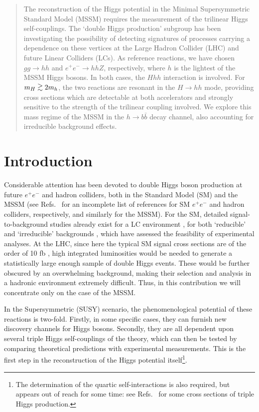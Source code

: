 \vskip1.0cm
\begin{abstract}
  The reconstruction of the Higgs potential in the Minimal
  Supersymmetric Standard Model (MSSM) requires the measurement of the
  trilinear Higgs self-couplings.  The `double Higgs production'
  subgroup has been investigating the possibility of detecting
  signatures of processes carrying a dependence on these vertices at
  the Large Hadron Collider (LHC) and future Linear Colliders (LCs).
  As reference reactions, we have chosen $gg\to hh$ and $e^+e^-\to h h
  Z$, respectively, where $h$ is the lightest of the MSSM Higgs
  bosons.  In both cases, the $Hhh$ interaction is involved.  For
  $m_H\OOrd2m_h$, the two reactions are resonant in the $H\to hh$
  mode, providing cross sections which are detectable at both
  accelerators and strongly sensitive to the strength of the trilinear
  coupling involved. We explore this mass regime of the MSSM in the
  $h\to b\bar b$ decay channel, also accounting for irreducible
  background effects.
\end{abstract}
\newpage

\section{Introduction}
\label{sec_intro}

Considerable attention has been devoted to double Higgs boson
production at future $e^+e^-$ and hadron colliders, both in the
Standard Model (SM) and the MSSM (see Refs.~\cite{revsmee,revsmlhc} for
an incomplete list of references for SM $e^+e^-$ and hadron colliders,
respectively, and similarly \cite{revmssmee,revmssmlhc} for the MSSM).  
For the SM,
detailed signal-to-background studies already exist for a LC
environment \cite{ee}, for both `reducible' and `irreducible'
backgrounds \cite{Lutz,noi}, which have assessed the feasibility of
experimental analyses.  At the LHC, since here the typical SM signal
cross sections are of the order of 10 fb \cite{pp}, high integrated
luminosities would be needed to generate a statistically large enough
sample of double Higgs events. These would be further obscured by an
overwhelming background, making their selection and analysis in a
hadronic environment extremely difficult.  Thus, in this contribution we will
concentrate only on the case of the MSSM.

In the Supersymmetric (SUSY) scenario, the phenomenological potential
of these reactions is two-fold. Firstly, in some specific cases, they
can furnish new discovery channels for Higgs bosons.  Secondly, they
are all dependent upon several triple Higgs self-couplings of the theory,
which can then be tested by comparing theoretical predictions with
experimental measurements. This is the first step in the
reconstruction of the Higgs potential itself\footnote{The
  determination of the quartic self-interactions is also required, but
  appears out of reach for some time: see Refs.~\cite{ee,pp} for some
  cross sections of triple Higgs production.}.

